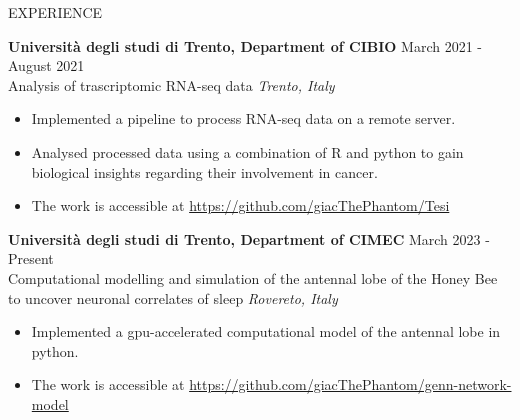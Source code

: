 \documentclass{resume} %
\begin{document}
\begin{rSection}{EXPERIENCE}

\textbf{Universit\`a degli studi di Trento, Department of CIBIO} \hfill March 2021 - August 2021\\
Analysis of trascriptomic RNA-seq data \hfill \textit{Trento, Italy}
 \begin{itemize}
    \itemsep -3pt {}
     \item Implemented a pipeline to process RNA-seq data on a remote server.
     \item Analysed processed data using a combination of R and python to gain biological insights regarding their involvement in cancer.
     \item The work is accessible at \href{https://github.com/giacThePhantom/Tesi}{https://github.com/giacThePhantom/Tesi}
 \end{itemize}


\textbf{Universit\`a degli studi di Trento, Department of CIMEC} \hfill March 2023 - Present\\
Computational modelling and simulation of the antennal lobe of the Honey Bee to uncover neuronal correlates of sleep \hfill \textit{Rovereto, Italy}
 \begin{itemize}
    \itemsep -3pt {}
     \item Implemented a gpu-accelerated computational model of the antennal lobe in python.
     \item The work is accessible at \href{https://github.com/giacThePhantom/genn-network-model}{https://github.com/giacThePhantom/genn-network-model}
 \end{itemize}

\end{rSection}

\end{document}
